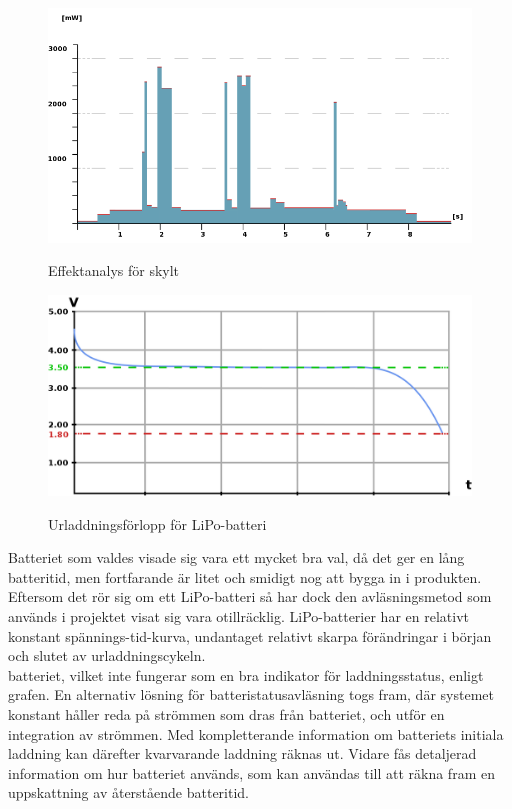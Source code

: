 \documentclass[a4paper,11pt]{article}
\begin{document}
\begin{figure}[H]
\includegraphics[scale=0.70, angle=0]{effekt.png}
\label{fig:effectgraph}
\caption{Effektanalys för skylt}
\end{figure}

\begin{figure}[H]
\includegraphics[scale=0.35, angle=0]{battery.png}
\label{fig:batterygraph}
\caption{Urladdningsförlopp för LiPo-batteri}
\end{figure}

Batteriet som valdes visade sig vara ett mycket bra val, då det ger en lång batteritid, men fortfarande är litet och smidigt nog att bygga in i produkten. Eftersom det rör sig om ett LiPo-batteri så har dock den avläsningsmetod som används i projektet visat sig vara otillräcklig. LiPo-batterier har en relativt konstant spännings-tid-kurva, undantaget relativt skarpa förändringar i början och slutet av urladdningscykeln. \\

batteriet, vilket inte fungerar som en bra indikator för laddningsstatus, enligt grafen. En alternativ lösning för batteristatusavläsning togs fram, där systemet konstant håller reda på strömmen som dras från batteriet, och utför en integration av strömmen. Med kompletterande information om batteriets initiala laddning kan därefter kvarvarande laddning räknas ut. Vidare fås detaljerad information om hur batteriet används, som kan användas till att räkna fram en uppskattning av återstående batteritid. \\
\end{document}
